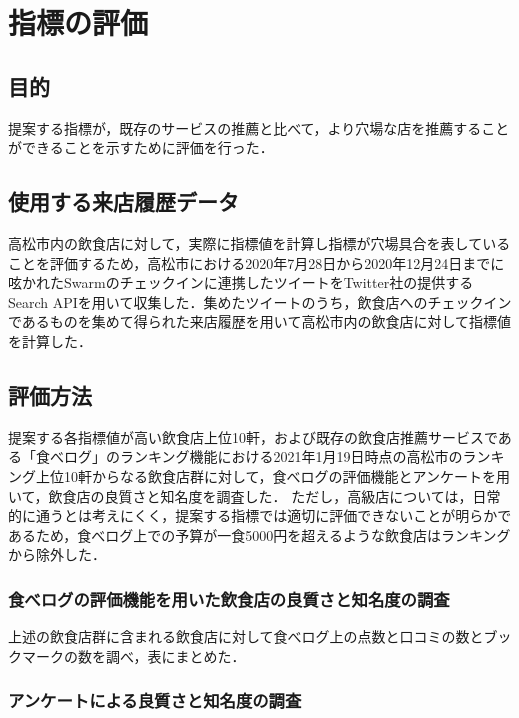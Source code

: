 \chapter{指標の評価}



\label{chap:experiment}

\section{目的}
提案する指標が，既存のサービスの推薦と比べて，より穴場な店を推薦することができることを示すために評価を行った．

\section{使用する来店履歴データ}
高松市内の飲食店に対して，実際に指標値を計算し指標が穴場具合を表していることを評価するため，高松市における2020年7月28日から2020年12月24日までに呟かれたSwarmのチェックインに連携したツイートをTwitter社の提供するSearch APIを用いて収集した．集めたツイートのうち，飲食店へのチェックインであるものを集めて得られた来店履歴を用いて高松市内の飲食店に対して指標値を計算した．

\section{評価方法}
提案する各指標値が高い飲食店上位10軒，および既存の飲食店推薦サービスである「食べログ」のランキング機能における2021年1月19日時点の高松市のランキング上位10軒からなる飲食店群に対して，食べログの評価機能とアンケートを用いて，飲食店の良質さと知名度を調査した．
ただし，高級店については，日常的に通うとは考えにくく，提案する指標では適切に評価できないことが明らかであるため，食べログ上での予算が一食5000円を超えるような飲食店はランキングから除外した．
	\subsection{食べログの評価機能を用いた飲食店の良質さと知名度の調査}\label{exp:scrutiny}

		上述の飲食店群に含まれる飲食店に対して食べログ上の点数と口コミの数とブックマークの数を調べ，表にまとめた．

	\subsection{アンケートによる良質さと知名度の調査}\label{exp:questionnaire}

